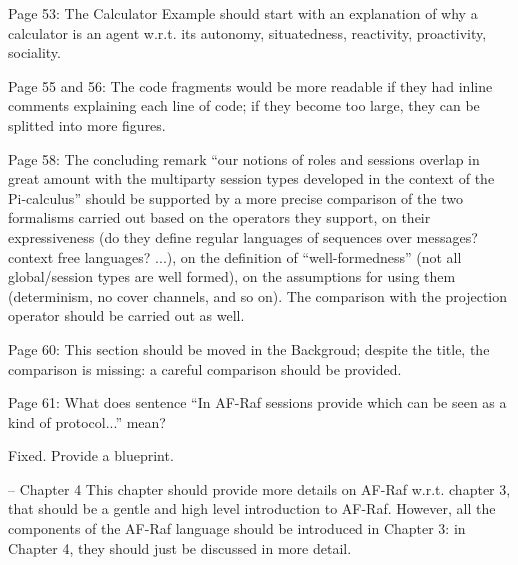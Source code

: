 \documentclass{article}
\newcommand{\todo}[1]{[\textcolor{red}{TODO}: #1]}
\newenvironment{them}{\noindent\begingroup\color{blue}}{\endgroup\par}
\begin{document}
\begin{them}

Page 53:
The Calculator Example should start with an explanation of why a calculator is
an agent w.r.t. its autonomy, situatedness, reactivity, proactivity, sociality.

\end{them}
\todo{}

\begin{them}

Page 55 and 56:
The code fragments would be more readable if they had inline comments
explaining each line of code; if they become too large, they can be splitted
into more figures.

\end{them}
\todo{}

\begin{them}

Page 58:
The concluding remark “our notions of roles and sessions overlap in great
amount with the multiparty session types developed in the context of the
Pi-calculus” should be supported by a more precise comparison of the two
formalisms carried out based on the operators they support, on their
expressiveness (do they define regular languages of sequences over messages?
context free languages? ...), on the definition of “well-formedness” (not all
global/session types are well formed), on the assumptions for using them
(determinism, no cover channels, and so on). The comparison with the projection
operator should be carried out as well.

\end{them}
\todo{}

\begin{them}

Page 60:
This section should be moved in the Backgroud; despite the title, the
comparison is missing: a careful comparison should be provided.

\end{them}
\todo{}

\begin{them}

Page 61:
What does sentence “In AF-Raf sessions provide which can be seen as a kind of
protocol...” mean?

\end{them}
Fixed. Provide a blueprint.

\begin{them}

-- Chapter 4
This chapter should provide more details on AF-Raf w.r.t. chapter 3, that
should be a gentle and high level introduction to AF-Raf. However, all the
components of the AF-Raf language should be introduced in Chapter 3: in Chapter
4, they should just be discussed in more detail.

\end{them}
\todo{}
\end{document}
